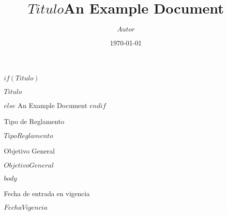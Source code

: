 \documentclass[10pt]{article}
\title{$Titulo$}
\title{An Example Document}
\author{$Autor$}
\date{\today}
\begin{document}
$if(Titulo)$

\begin{center}
{\rmfamily \Large \color{cpiOrange} $Titulo$ \\ \vspace{12pt}}
\end{center}


$else$
An Example Document
$endif$

{\rmfamily \Large \color{cpiOrange} Tipo de Reglamento \\ \vspace{6pt}}



$TipoReglamento$

\tableofcontents

\pagebreak


{\rmfamily \Large \color{cpiOrange} Objetivo General \\ \vspace{6pt}}

$ObjetivoGeneral$



$body$

{\vspace{50pt} \rmfamily \Large \color{cpiOrange} Fecha de entrada en vigencia \\ \vspace{6pt}}

$FechaVigencia$
\end{document}
